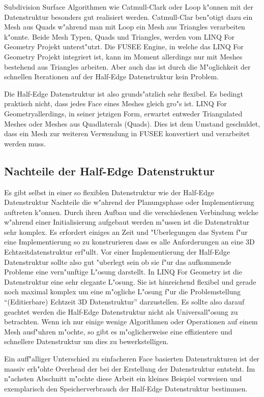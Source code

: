 \documentclass[pagesize, paper=a4, fontsize=12pt,titlepage=true, headings=small, headnosepline, abstractoff, liststotoc, nochapterprefix, plainheadsepline]{scrreprt}
\newcommand{\LFG}{LINQ For Geometry}
\newcommand{\LFGS}{LINQ For Geometry }
\newcommand{\HES}{Half-Edge Datenstruktur }
\begin{document}
Subdivision Surface Algorithmen wie Catmull-Clark oder Loop k"onnen mit der Datenstruktur besonders gut realisiert werden. Catmull-Clar ben"otigt dazu ein Mesh aus Quads w"ahrend man mit Loop ein Mesh aus Triangles verarbeiten k"onnte. Beide Mesh Typen, Quads und Triangles, werden vom \LFGS Projekt unterst"utzt. Die FUSEE Engine, in welche das \LFGS Projekt integriert ist, kann im Moment allerdings nur mit Meshes bestehend aus Triangles arbeiten. Aber auch das ist durch die M"oglichkeit der schnellen Iterationen auf der \HES kein Problem.

Die \HES ist also grunds"atzlich sehr flexibel. Es bedingt praktisch nicht, dass jedes Face eines Meshes gleich gro"s ist. \LFG allerdings, in seiner jetzigen Form, erwartet entweder Triangulated Meshes oder Meshes aus Quadlaterals (Quads). Dies ist dem Umstand geschuldet, dass ein Mesh zur weiteren Verwendung in FUSEE konvertiert und verarbeitet werden muss.
		\subsection {Nachteile der \HES}
Es gibt selbst in einer so flexiblen Datenstruktur wie der \HES Nachteile die w"ahrend der Planungsphase oder Implementierung auftreten k"onnen.
			Durch ihren Aufbau und die verschiedenen Verbindung welche w"ahrend einer Initialisierung aufgebaut werden m"ussen ist die Datenstruktur sehr komplex. Es erfordert einiges an Zeit und "Uberlegungen das System f"ur eine Implementierung so zu konstrurieren dass es alle Anforderungen an eine 3D Echtzeitdatenstruktur erf"ullt. Vor einer Implementierung der \HES sollte also gut "uberlegt sein ob sie f"ur das aufkommende Probleme eine vern"unftige L"osung darstellt. In \LFGS ist die Datenstruktur eine sehr elegante L"osung. Sie ist hinreichend flexibel und gerade noch maximal komplex um eine m"ogliche L"osung f"ur die Problemstellung "`(Editierbare) Echtzeit 3D Datenstruktur"' darzustellen. Es sollte also darauf geachtet werden die \HES nicht als Universall"osung zu betrachten. Wenn ich nur einige wenige Algorithmen oder Operationen auf einem Mesh ausf"uhren m"ochte, so gibt es m"oglicherweise eine effizientere und schnellere Datenstruktur um dies zu bewerkstelligen.

Ein auff"alliger Unterschied zu einfacheren Face basierten Datenstrukturen ist der massiv erh"ohte Overhead der bei der Erstellung der Datenstruktur entsteht. Im n"achsten Abschnitt m"ochte diese Arbeit ein kleines Beispiel vorweisen und exemplarisch den Speicherverbrauch der \HES bestimmen.
\end{document}
